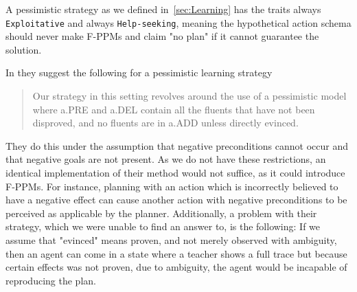 \documentclass[\master/Master.tex]{subfiles}
\begin{document}
	A pessimistic strategy as we defined in~\ref{sec:Learning} has the traits always \texttt{Exploitative} and always \texttt{Help-seeking},
	meaning the hypothetical action schema should never make F-PPMs and claim "no plan" if it cannot guarantee the solution.

	In \cite{Walsh2008} they suggest the following for a pessimistic learning strategy
	
	\begin{quotation}
		Our strategy in
		this setting revolves around the use of a pessimistic model
		where a.PRE and a.DEL contain all the fluents that have
		not been disproved, and no fluents are in a.ADD unless directly
		evinced.
	\end{quotation}
	 
	They do this under the assumption that negative preconditions cannot occur and that negative goals are not present. As we do not have these restrictions, an identical implementation of their method would not suffice, as it could introduce F-PPMs. For instance, planning with an action which is incorrectly believed to have a negative effect can cause another action with negative preconditions to be perceived as applicable by the planner.
	Additionally, a problem with their strategy, which we were unable to find an answer to, is the following: If we assume that "evinced" means proven, and not merely observed with ambiguity, then an agent can come in a state where a teacher shows a full trace but because certain effects was not proven, due to ambiguity, the agent would be incapable of reproducing the plan.
	
\end{document}
